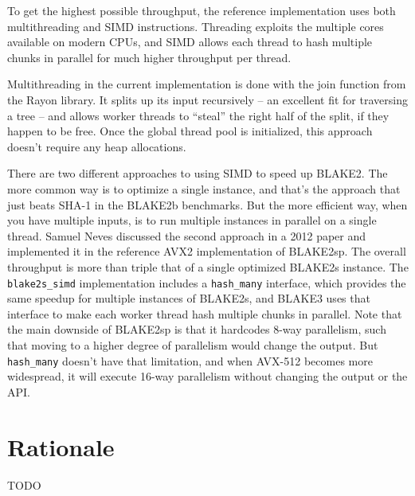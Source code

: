 \documentclass[11pt,notitlepage,a4paper]{article}
\begin{document}
To get the highest possible throughput, the reference implementation uses both multithreading and SIMD instructions. Threading exploits the multiple cores available on modern CPUs, and SIMD allows each thread to hash multiple chunks in parallel for much higher throughput per thread.

Multithreading in the current implementation is done with the join function from the Rayon library. It splits up its input recursively -- an excellent fit for traversing a tree -- and allows worker threads to ``steal'' the right half of the split, if they happen to be free. Once the global thread pool is initialized, this approach doesn't require any heap allocations.

There are two different approaches to using SIMD to speed up BLAKE2. The more common way is to optimize a single instance, and that's the approach that just beats SHA-1 in the BLAKE2b benchmarks. But the more efficient way, when you have multiple inputs, is to run multiple instances in parallel on a single thread. Samuel Neves discussed the second approach in a 2012 paper and implemented it in the reference AVX2 implementation of BLAKE2sp. The overall throughput is more than triple that of a single optimized BLAKE2s instance. The \texttt{blake2s\_simd} implementation includes a \texttt{hash\_many} interface, which provides the same speedup for multiple instances of BLAKE2s, and BLAKE3 uses that interface to make each worker thread hash multiple chunks in parallel. Note that the main downside of BLAKE2sp is that it hardcodes 8-way parallelism, such that moving to a higher degree of parallelism would change the output. But \texttt{hash\_many} doesn't have that limitation, and when AVX-512 becomes more widespread, it will execute 16-way parallelism without changing the output or the API.

\section{Rationale}\label{sec:rationale}

TODO



\end{document}
